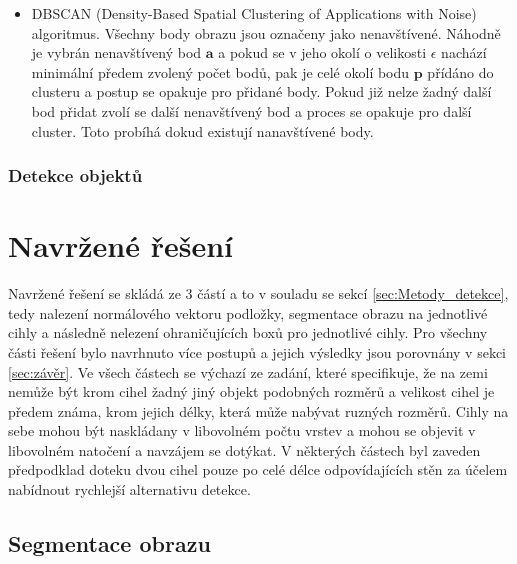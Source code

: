 \documentclass[twoside]{ctuthesis}
\newcommand{\tl}[1]{$\mathbf{#1}$}
\begin{document}
\begin{itemize}
\begin{itemize}
        \item DBSCAN (Density-Based Spatial Clustering of Applications with Noise) algoritmus. Všechny body obrazu jsou označeny jako nenavštívené. Náhodně je vybrán nenavštívený bod \tl{a} a pokud se v jeho okolí o velikosti $\epsilon$ nachází minimální předem zvolený počet bodů, pak je celé okolí bodu \tl{p} přídáno do clusteru a postup se opakuje pro přidané body. Pokud již nelze žadný další bod přidat zvolí se další nenavštívený bod a proces se opakuje pro další cluster. Toto probíhá dokud existují nanavštívené body. 
    \end{itemize}
\end{itemize}

\subsubsection{Detekce objektů}



\section{Navržené řešení}
Navržené řešení se skládá ze 3 částí a to v souladu se sekcí \ref{sec:Metody_detekce}, tedy nalezení normálového vektoru podložky, segmentace obrazu na jednotlivé cihly a následně nelezení ohraničujících boxů pro jednotlivé cihly. Pro všechny části řešení bylo navrhnuto více postupů a jejich výsledky jsou porovnány v sekci \ref{sec:závěr}. Ve všech částech se výchazí ze zadání, které specifikuje, že na zemi nemůže být krom cihel žadný jiný objekt podobných rozměrů a velikost cihel je předem známa, krom jejich délky, která může nabývat ruzných rozměrů. Cihly na sebe mohou být naskládany v libovolném počtu vrstev a mohou se objevit v libovolném natočení a navzájem se dotýkat. V některých částech byl zaveden předpodklad doteku dvou cihel pouze po celé délce odpovídajících stěn za účelem nabídnout rychlejší alternativu detekce.
\subsection{Segmentace obrazu}
\end{document}
